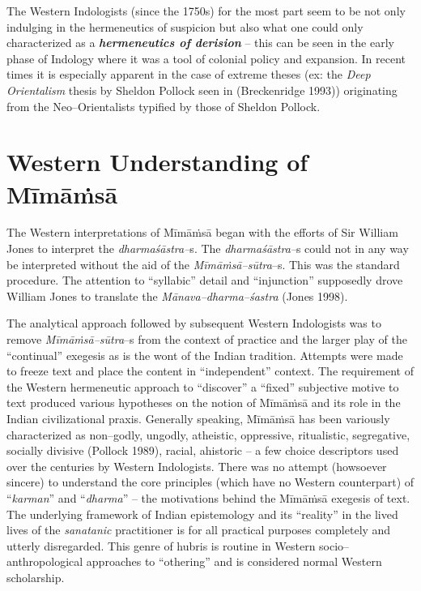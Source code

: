 The Western Indologists (since the 1750s) for the most part seem to be not only indulging in the hermeneutics of suspicion but also what one could only characterized as a \textbf{\textit{hermeneutics of derision}} – this can be seen in the early phase of Indology where it was a tool of colonial policy and expansion. In recent times it is especially apparent in the case of extreme theses (ex: the \textit{Deep Orientalism} thesis by Sheldon Pollock seen in (Breckenridge 1993)) originating from the Neo–Orientalists typified by those of Sheldon Pollock.


\section*{Western Understanding of Mīmāṁsā}

The Western interpretations of Mīmāṁsā began with the efforts of Sir William Jones to interpret the \textit{dharmaśāstra–}s. The \textit{dharmaśāstra–}s could not in any way be interpreted without the aid of the \textit{Mīmāṁsā–sūtra}–s. This was the standard procedure. The attention to “syllabic” detail and “injunction” supposedly drove William Jones to translate the \textit{Mānava–dharma–śastra} (Jones 1998).

The analytical approach followed by subsequent Western Indologists was to remove \textit{Mīmāṁsā–sūtra}–s from the context of practice and the larger play of the “continual” exegesis as is the wont of the Indian tradition. Attempts were made to freeze text and place the content in “independent” context. The requirement of the Western hermeneutic approach to “discover” a “fixed” subjective motive to text produced various hypotheses on the notion of Mīmāṁsā and its role in the Indian civilizational praxis. Generally speaking, Mīmāṁsā has been variously characterized as non–godly, ungodly, atheistic, oppressive, ritualistic, segregative, socially divisive (Pollock 1989), racial, ahistoric – a few choice descriptors used over the centuries by Western Indologists. There was no attempt (howsoever sincere) to understand the core principles (which have no Western counterpart) of “\textit{karman}” and “\textit{dharma}” – the motivations behind the Mīmāṁsā exegesis of text. The underlying framework of Indian epistemology and its “reality” in the lived lives of the \textit{sanatanic} practitioner is for all practical purposes completely and utterly disregarded. This genre of hubris is routine in Western socio–anthropological approaches to “othering” and is considered normal Western scholarship. 


